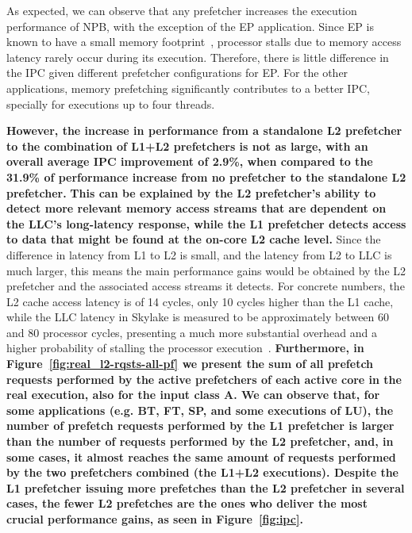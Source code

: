 \documentclass[AMA,final,STIX1COL]{WileyNJD-v2}
\newcommand\new[1]{{\color{red}\textbf{#1}}}
\begin{document}
As expected, we can observe that any prefetcher increases the execution performance of NPB, with the exception of the EP application. 
Since EP is known to have a small memory footprint~\cite{jin1999openmp}, processor stalls due to memory access latency rarely occur during its execution. 
Therefore, there is little difference in the IPC given different prefetcher configurations for EP. 
For the other applications, memory prefetching significantly contributes to a better IPC, specially for executions up to four threads.

\new{However, the increase in performance from a standalone L2 prefetcher to the combination of L1+L2 prefetchers is not as large, with an overall average IPC improvement of 2.9\%, when compared to the 31.9\% of performance increase from no prefetcher to the standalone L2 prefetcher.}
\new{This can be explained by the L2 prefetcher's ability to detect more relevant memory access streams that are dependent on the LLC's long-latency response, while the L1 prefetcher detects access to data that might be found at the on-core L2 cache level.}
Since the difference in latency from L1 to L2 is small, and the latency from L2 to LLC is much larger, this means the main performance gains would be obtained by the L2 prefetcher and the associated access streams it detects.
For concrete numbers, the L2 cache access latency is of 14 cycles, only 10 cycles higher than the L1 cache, while the LLC latency in Skylake is measured to be approximately between 60 and 80 processor cycles, presenting a much more substantial overhead and a higher probability of stalling the processor execution~\cite{alves2015sinuca}. 
\new{Furthermore, in Figure~\ref{fig:real_l2-rqsts-all-pf} we present the sum of all prefetch requests performed by the active prefetchers of each active core in the real execution, also for the input class A.
We can observe that, for some applications (e.g. BT, FT, SP, and some executions of LU), the number of prefetch requests performed by the L1 prefetcher is larger than the number of requests performed by the L2 prefetcher, and, in some cases, it almost reaches the same amount of requests performed by the two prefetchers combined (the L1+L2 executions).
Despite the L1 prefetcher issuing more prefetches than the L2 prefetcher in several cases, the fewer L2 prefetches are the ones who deliver the most crucial performance gains, as seen in Figure~\ref{fig:ipc}.}
\end{document}
